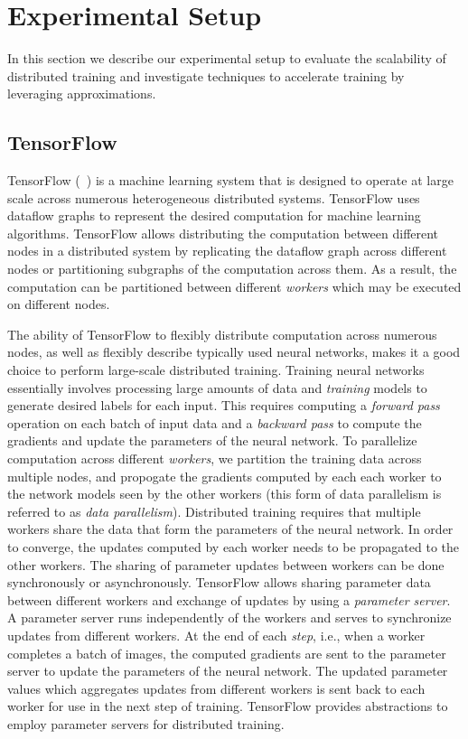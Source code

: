 \section{Experimental Setup}
In this section we describe our experimental setup to evaluate the scalability of distributed training and investigate techniques to accelerate training by leveraging approximations. 
\subsection{TensorFlow}
TensorFlow (~\cite{tensorflow}) is a machine learning system that is designed to operate at large scale across numerous heterogeneous distributed systems. TensorFlow uses dataflow graphs to represent the desired computation for machine learning algorithms. TensorFlow allows distributing the computation between different nodes in a distributed system by replicating the dataflow graph across different nodes or partitioning subgraphs of the computation across them. As a result, the computation can be partitioned between different \emph{workers} which may be executed on different nodes. 

The ability of TensorFlow to flexibly distribute computation across numerous nodes, as well as flexibly describe typically used neural networks, makes it a good choice to perform large-scale distributed training. Training neural networks essentially involves processing large amounts of data and \emph{training} models to generate desired labels for each input. This requires computing a \emph{forward pass} operation on each batch of input data and a \emph{backward pass} to compute the gradients and update the parameters of the neural network. To parallelize computation across different \emph{workers}, we partition the training data across multiple nodes, and propogate the gradients computed by each each worker to the network models seen by the other workers (this form of data parallelism is referred to as \emph{data parallelism}). Distributed training requires that multiple workers share the data that form the parameters of the neural network. In order to converge, the updates computed by each worker needs to be propagated to the other workers. The sharing of parameter updates between workers can be done synchronously or asynchronously. TensorFlow allows sharing parameter data between different workers and exchange of updates by using a \emph{parameter server}\cite{parameter_server}. A parameter server runs independently of the workers and serves to synchronize updates from different workers. At the end of each \emph{step}, i.e., when a worker completes a batch of images, the computed gradients are sent to the parameter server to update the parameters of the neural network. The 
updated parameter values which aggregates updates from different workers is sent back to each worker for use in the next step of training.
TensorFlow provides abstractions to employ parameter servers for distributed training. 

